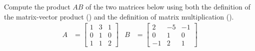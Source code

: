 Compute the product $AB$ of the two matrices below using both the definition of the matrix-vector product () and the definition of matrix multiplication ().
%
\begin{align*}
A&=
\begin{bmatrix}
1 & 3 & 1\\ 0 & 1 & 0\\1 & 1 & 2
\end{bmatrix}
&
B&=
\begin{bmatrix}
2 & -5 & -1 \\ 0 & 1 & 0\\-1 & 2 & 1
\end{bmatrix}
\end{align*}
